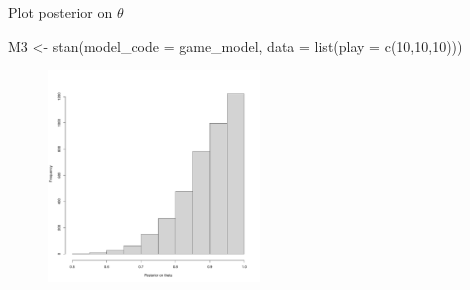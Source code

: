 \documentclass[
  11pt,
  ignorenonframetext,
]{beamer}
\newenvironment{Shaded}{\begin{snugshade}}{\end{snugshade}}
\newcommand{\AttributeTok}[1]{\textcolor[rgb]{0.40,0.45,0.13}{#1}}
\newcommand{\DecValTok}[1]{\textcolor[rgb]{0.68,0.00,0.00}{#1}}
\newcommand{\FunctionTok}[1]{\textcolor[rgb]{0.28,0.35,0.67}{#1}}
\newcommand{\NormalTok}[1]{\textcolor[rgb]{0.00,0.23,0.31}{#1}}
\newcommand{\OtherTok}[1]{\textcolor[rgb]{0.00,0.23,0.31}{#1}}
\begin{document}
\begin{frame}[fragile]{Plot posterior on \(\theta\)}
\protect\hypertarget{plot-posterior-on-theta}{}
\begin{Shaded}
\begin{Highlighting}[]
\NormalTok{M3 }\OtherTok{\textless{}{-}} \FunctionTok{stan}\NormalTok{(}\AttributeTok{model\_code =}\NormalTok{ game\_model,  }
           \AttributeTok{data =} \FunctionTok{list}\NormalTok{(}\AttributeTok{play =} \FunctionTok{c}\NormalTok{(}\DecValTok{10}\NormalTok{,}\DecValTok{10}\NormalTok{,}\DecValTok{10}\NormalTok{)))}
\end{Highlighting}
\end{Shaded}

\begin{figure}

{\centering \includegraphics[width=0.5\textwidth,height=\textheight]{0_lectures_files/figure-beamer/unnamed-chunk-347-1.pdf}

}

\end{figure}
\end{frame}
\end{document}
